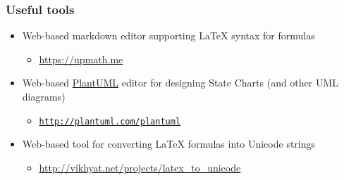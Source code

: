 \documentclass[presentation]{beamer}\mode<presentation>{\usetheme{AMSCesenaPurpleAndGold}}
\begin{document}
\begin{frame}\label{useful-tools}
\frametitle{Useful tools}
    
    \begin{itemize}
        \item Web-based markdown editor supporting \LaTeX{} syntax for formulas
        \begin{itemize}
            \item \url{https://upmath.me}
        \end{itemize}
        
        \vfill
        
        \item Web-based \href{http://plantuml.com/}{PlantUML} editor for designing State Charts (and other UML diagrams)
        \begin{itemize}
            \item \href{http://www.plantuml.com/plantuml/uml/XOz1JW8n58RtFSLRWWbaW1qXG4HCt60Yi48MpVI93Prsqhwget4XmSG5rt2XPp7n3dCI2uYEoIGkclxfz_wlUNr7t99F57DBgLDkUG8dUCMzebEZQIpl4PfH0Ow94-uGPGf14bSoTkNj4KyG1iPRYPPTIu60IKeP27InbIb9ercXwRPgU600npnUBgpnMWoCChRJ6MeXzQBR1QFa3PPDJ3NUfI6X25CPAcLksIDZiwCvr6fTS17RwKDeW_5KeNprLAr_frMrBdM5FjQ_TmJvosiupyn5UqEZKBpKi_Ff9AGvEtW3_jUsUTksyyqxSuszjDc6ptMmdOt6mul9_EUzLR2LVDQ4lnkteTVh7M2h5FPH2v-eBm00}{\texttt{http://plantuml.com/plantuml}}
        \end{itemize}
        
        \vfill
        
        \item Web-based tool for converting \LaTeX{} formulas into Unicode strings
        \begin{itemize}
            \item \url{http://vikhyat.net/projects/latex_to_unicode}
        \end{itemize}
    \end{itemize}
    
\end{frame}

\maketitle

\end{document}
